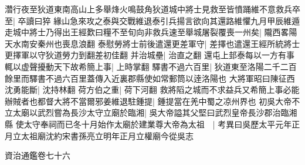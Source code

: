 濳行夜至狄道東南高山上多舉烽火鳴鼓角狄道城中將士見救至皆憤踊維不意救兵卒至|{
	卒讀曰猝}
緣山急來攻之泰與交戰維退泰引兵揚言欲向其還路維懼九月甲辰維遁走城中將士乃得出王經歎曰糧不至旬向非救兵速至舉城屠裂覆喪一州矣|{
	隴西畧陽天水南安秦州也喪息浪翻}
泰慰勞將士前後遣還更差軍守|{
	差擇也遣還王經所統將士更擇軍以守狄道勞力到翻差初佳翻}
并治城壘|{
	治直之翻}
還屯上邽泰每以一方有事輒以虚聲擾動天下故希簡上事|{
	上時掌翻}
驛書不過六百里|{
	狄道東至洛陽二千二百餘里而驛書不過六百里蓋傳入近裏郡縣使如常郵筒以逹洛陽也}
大將軍昭曰陳征西沈勇能斷|{
	沈持林翻}
荷方伯之重|{
	荷下河翻}
救將䧟之城而不求益兵又希簡上事必能辦賊者也都督大將不當爾邪姜維退駐鍾提|{
	鍾提當在羌中蜀之凉州界也}
初吳大帝不立太廟以武烈嘗為長沙太守立廟於臨湘|{
	吳大帝謚其父堅曰武烈皇帝長沙郡治臨湘縣}
使太守奉祠而已冬十月始作太廟於建業尊大帝為太祖　|{
	考異曰吳歷太平元年正月立太祖廟沈約宋書孫亮立明年正月立權廟今從吳志}


資治通鑑卷七十六
